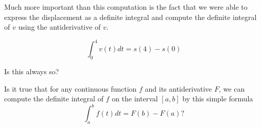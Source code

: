 \documentclass{ximera}
\begin{document}
\begin{example}
Much more important than this computation is the fact that we were able to express the displacement as a definite integral and  compute the definite integral  of $v$ using the antiderivative of $v$.

 \[
   \int_{0}^{4}v(t) dt=s(4)-s(0)
\]

Is this always so?

Is it true that for any continuous function $f$ and its antiderivative $F$, we can compute the definite integral of $f$ on the interval $[a,b]$ by this simple formula
\[
   \int_{a}^{b}f(t) dt=F(b)-F(a)?
\]

\end{example}
\end{document}

